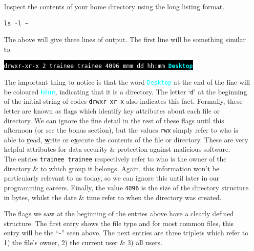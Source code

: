 \documentclass[a4paper,12pt,twoside]{memoir}
\begin{document}
\begin{steps}
Inspect the contents of your home directory using the long listing format. \\
\begin{lstlisting}
ls -l ~
\end{lstlisting}
\end{steps}

The above will give three lines of output.
The first line will be something similar to
\begin{center}
\colorbox{black}{\texttt{\textcolor{white}{drwxr-xr-x 2 trainee trainee 4096 mmm dd hh:mm} \textcolor{cyan}{\textbf{Desktop}}}}\\
\end{center}

\begin{information}
The important thing to notice is that the word \textcolor{cyan}{\texttt{Desktop}} at the end of the line will be coloured \textcolor{cyan}{\textbf{blue}}, indicating that it is a directory.
The letter `\texttt{d}' at the beginning of the initial string of codes \texttt{drwxr-xr-x} also indicates this fact.
Formally, these letter are known as flags which identify key attributes about each file or directory.
We can ignore the fine detail in the rest of these flags until this afternoon (or see the bonus section), but the values \texttt{rwx} simply refer to who is able to \textbf{\underline{r}}ead, \textbf{\underline{w}}rite or e\textbf{\underline{x}}ecute the contents of the file or directory. 
These are very helpful attributes for data security \& protection against malicious software.\\

The entries \texttt{trainee trainee} respectively refer to who is the owner of the directory \& to which group it belongs.
Again, this information won't be particularly relevant to us today, so we can ignore this until later in our programming careers.
Finally, the value \texttt{4096} is the size of the directory structure in bytes, whilst the date \& time refer to when the directory was created.\\

\begin{bonus}
The flags we saw at the beginning of the entries above have a clearly defined structure. 
The first entry shows the file type and for most common files, this entry will be the ``-'' seen above.
The next entries are three triplets which refer to 1) the file's owner, 2) the current user \& 3) all users.
\end{bonus}


\end{information}
\end{document}
